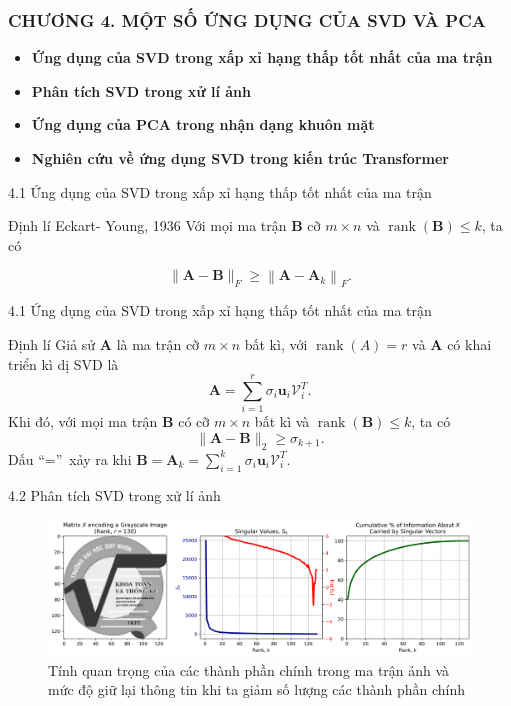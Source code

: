\documentclass[notheorems,envcountsect,hyperref=unicode]{beamer}
\begin{document}
\begin{frame}
	\frametitle{\MakeUppercase{\textsc\bf\large CHƯƠNG 4. Một số ứng dụng của SVD và PCA}}
	\renewcommand{\baselinestretch}{1.5}
	\begin{itemize}
		\item [4.1] \textbf{Ứng dụng của SVD trong xấp xỉ hạng thấp tốt nhất của ma trận}
		\item [4.2] \textbf{Phân tích SVD trong xử lí ảnh}
		\item [4.3] \textbf{Ứng dụng của PCA trong nhận dạng khuôn mặt}
		\item [4.4] \textbf{ Nghiên cứu về ứng dụng SVD trong kiến trúc Transformer}
	\end{itemize}
\end{frame}
\begin{frame}{4.1 Ứng dụng của SVD trong xấp xỉ hạng thấp tốt nhất của ma trận}
\begin{block}{\textnormal{{Định lí Eckart- Young, 1936} }}
Với mọi ma trận $\mathbf{B}$ cỡ $m \times n$ và $\operatorname{rank}(\mathbf{B}) \leqslant k$, ta có

$$
\|\mathbf{A}-\mathbf{B}\|_{F} \geqslant\left\|\mathbf{A}-\mathbf{A}_{k}\right\|_{F} .
$$
\end{block}
\end{frame}

\begin{frame}{4.1 Ứng dụng của SVD trong xấp xỉ hạng thấp tốt nhất của ma trận}
	\begin{block}{\textnormal{{Định lí} }}
 Giả sử $\mathbf{A}$ là ma trận cỡ $m \times n$ bất kì, với $\operatorname{rank}(A)=r$ và $\mathbf{A}$ có khai triển kì dị SVD là
$$
\mathbf{A}=\sum_{i=1}^{r} \sigma_{i} \mathbf{u}_{i} \mathcal{V}_{i}^{T} .
$$
Khi đó, với mọi ma trận $\mathbf{B}$ có cỡ $m \times n$ bất kì và $\operatorname{rank}(\mathbf{B}) \leqslant k$, ta có
$$
\|\mathbf{A}-\mathbf{B}\|_{2} \geqslant \sigma_{k+1} .
$$
Dấu \textquotedblleft  =\textquotedblright\ xảy ra khi $\mathbf{B}=\mathbf{A}_{k}=\sum_{i=1}^{k} \sigma_{i} \mathbf{u}_{i} \mathcal{V}_{i}^{T}$.
	\end{block}
\end{frame}

\begin{frame}{4.2 Phân tích SVD trong xử lí ảnh}
	\begin{figure}[htp]
		\centering
		\includegraphics[scale=0.35]{image-singular-values.png}
		\caption{Tính quan trọng của các thành phần chính trong ma trận ảnh và mức độ giữ lại thông tin khi ta giảm số lượng các thành phần chính}
		\label{fig:svd_sigular}
	\end{figure}
\end{frame}
\end{document}
